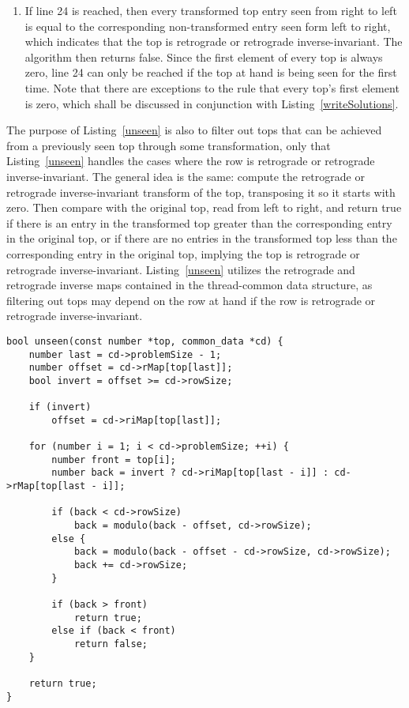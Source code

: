 \begin{enumerate}
\addtocounter{enumi}{3}
\item If line 24 is reached, then every transformed top entry seen from right to left is equal to the corresponding non-transformed entry seen form left to right, which indicates that the top is retrograde or retrograde inverse-invariant. The algorithm then returns false. Since the first element of every top is always zero, line 24 can only be reached if the top at hand is being seen for the first time. Note that there are exceptions to the rule that every top's first element is zero, which shall be discussed in conjunction with Listing~\ref{writeSolutions}.
\end{enumerate}

The purpose of Listing~\ref{unseen} is also to filter out tops that can be achieved from a previously seen top through some transformation, only that Listing~\ref{unseen} handles the cases where the row is retrograde or retrograde inverse-invariant. The general idea is the same: compute the retrograde or retrograde inverse-invariant transform of the top, transposing it so it starts with zero. Then compare with the original top, read from left to right, and return true if there is an entry in the transformed top greater than the corresponding entry in the original top, or if there are no entries in the transformed top less than the corresponding entry in the original top, implying the top is retrograde or retrograde inverse-invariant. Listing~\ref{unseen} utilizes the retrograde and retrograde inverse maps contained in the thread-common data structure, as filtering out tops may depend on the row at hand if the row is retrograde or retrograde inverse-invariant.

\begin{lstlisting}[caption={Determining whether a top has not yet been seen for retrograde or retrograde inverse-invariant rows.},label={unseen}]
bool unseen(const number *top, common_data *cd) {
    number last = cd->problemSize - 1;
    number offset = cd->rMap[top[last]];
    bool invert = offset >= cd->rowSize;

    if (invert)
        offset = cd->riMap[top[last]];

    for (number i = 1; i < cd->problemSize; ++i) {
        number front = top[i];
        number back = invert ? cd->riMap[top[last - i]] : cd->rMap[top[last - i]];

        if (back < cd->rowSize)
            back = modulo(back - offset, cd->rowSize);
        else {
            back = modulo(back - offset - cd->rowSize, cd->rowSize);
            back += cd->rowSize;
        }

        if (back > front)
            return true;
        else if (back < front)
            return false;
    }

    return true;
}
\end{lstlisting}

